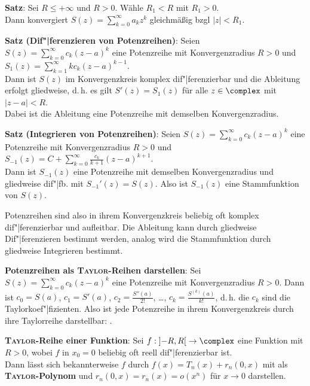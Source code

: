 \textbf{Satz}: Sei $R \le +\infty$ und $R > 0$.
Wähle $R_1 < R$ mit $R_1 > 0$. \\
Dann konvergiert $S(z) = \sum_{k=0}^\infty a_k z^k$ gleichmäßig
bzgl $|z| < R_1$.

\linie

\textbf{Satz (Dif"|ferenzieren von Potenzreihen)}:
Seien $S(z) = \sum_{k=0}^\infty c_k (z - a)^k$ eine Potenzreihe mit
Konvergenzradius $R > 0$ und
$S_1(z) = \sum_{k=1}^\infty k c_k (z - a)^{k-1}$. \\
Dann ist $S(z)$ im Konvergenzkreis komplex dif"|ferenzierbar und die
Ableitung erfolgt gliedweise, d.\,h. es gilt $S'(z) = S_1(z)$ für alle
$z \in \complex$ mit $|z - a| < R$. \\
Dabei ist die Ableitung eine Potenzreihe mit demselben Konvergenzradius.

\textbf{Satz (Integrieren von Potenzreihen)}:
Seien $S(z) = \sum_{k=0}^\infty c_k (z - a)^k$ eine Potenzreihe mit
Konvergenzradius $R > 0$ und
$S_{-1}(z) = C + \sum_{k=0}^\infty \frac{c_k}{k + 1} (z - a)^{k+1}$. \\
Dann ist $S_{-1}(z)$ eine Potenzreihe mit demselben Konvergenzradius und
gliedweise dif"|fb. mit $S_{-1}'(z) = S(z)$.
Also ist $S_{-1}(z)$ eine Stammfunktion von $S(z)$.

Potenzreihen sind also in ihrem Konvergenzkreis beliebig oft komplex
dif"|ferenzierbar und aufleitbar.
Die Ableitung kann durch gliedweise Dif"|ferenzieren bestimmt werden,
analog wird die Stammfunktion durch gliedweise Integrieren bestimmt.

\linie

\textbf{Potenzreihen als \textsc{Taylor}-Reihen darstellen}:
Sei $S(z) = \sum_{k=0}^\infty c_k (z - a)^k$ eine Potenzreihe mit
Konvergenzradius $R > 0$.
Dann ist $c_0 = S(a)$, $c_1 = S'(a)$, $c_2 = \frac{S''(a)}{2!}$, \ldots,
$c_k = \frac{S^{(k)}(a)}{k!}$, d.\,h. die $c_k$ sind die Taylorkoef"|fizienten.
Also ist jede Potenzreihe in ihrem Konvergenzkreis durch ihre Taylorreihe
darstellbar:
.

\textbf{\textsc{Taylor}-Reihe einer Funktion}:
Sei $f: \left]-R,R\right[ \rightarrow \complex$ eine Funktion mit $R > 0$,
wobei $f$ in $x_0 = 0$ beliebig oft reell dif"|ferenzierbar ist. \\
Dann lässt sich bekannterweise $f$ durch $f(x) = T_n(x) + r_n(0, x)$
mit  als
\textbf{\textsc{Taylor}-Polynom} und $r_n(0, x) = r_n(x) = o(x^n)$ für
$x \to 0$ darstellen.

